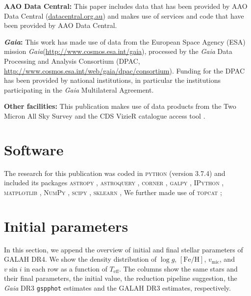 \documentclass[
  journal=pasa,
  manuscript=research-paper, %
  year=2024,
  volume=37
]{cup-journal}
\newcommand{\Teff}{$T_\mathrm{eff}$\xspace}
\newcommand{\logg}{$\log g$\xspace}
\newcommand{\feh}{$\mathrm{[Fe/H]}$\xspace}
\newcommand{\vmic}{$v_\mathrm{mic}$\xspace}
\newcommand{\vsini}{$v \sin i$\xspace}
\newcommand{\Gaia}{\textit{Gaia}\xspace}
\begin{document}
\textbf{AAO Data Central:} This paper includes data that has been provided by AAO Data Central  (\url{datacentral.org.au}) and makes use of services and code that have been provided by AAO Data Central.

\textbf{\Gaia: } This work has made use of data from the European Space Agency (ESA) mission \Gaia (\url{http://www.cosmos.esa.int/gaia}), processed by the \Gaia Data Processing and Analysis Consortium (DPAC, \url{http://www.cosmos.esa.int/web/gaia/dpac/consortium}). Funding for the DPAC has been provided by national institutions, in particular the institutions participating in the \Gaia Multilateral Agreement. 

\textbf{Other facilities:} This publication makes use of data products from the Two Micron All Sky Survey \citep{Skrutskie2006} and the CDS VizieR catalogue access tool \citep{Vizier2000}.

\section*{Software}

The research for this publication was coded in \textsc{python} (version 3.7.4) and included its packages
\textsc{astropy} \citep[v. 3.2.2;][]{Robitaille2013,PriceWhelan2018},
\textsc{astroquery} \citep[v. 0.4;][]{Ginsburg2019},
\textsc{corner} \citep[v. 2.0.1;][]{corner},
\textsc{galpy} \citep[version 1.6.0;][]{Bovy2015},
\textsc{IPython} \citep[v. 7.8.0;][]{ipython},
\textsc{matplotlib} \citep[v. 3.1.3;][]{matplotlib},
\textsc{NumPy} \citep[v. 1.17.2;][]{numpy},
\textsc{scipy} \citep[version 1.3.1;][]{scipy},
\textsc{sklearn} \citep[v. 0.21.3;][]{scikit-learn},
We further made use of \textsc{topcat} \citep[version 4.7;][]{Taylor2005};




\appendix

\section{Initial parameters}

In this section, we append the overview of initial and final stellar parameters of GALAH DR4. We show the density distribution of \logg, \feh, \vmic, and \vsini in each row as a function of \Teff. The columns show the same stars and their final parameters, the initial value, the reduction pipeline suggestion, the \Gaia DR3 \texttt{gspphot} estimates and the GALAH DR3 estimates, respectively.
\end{document}
